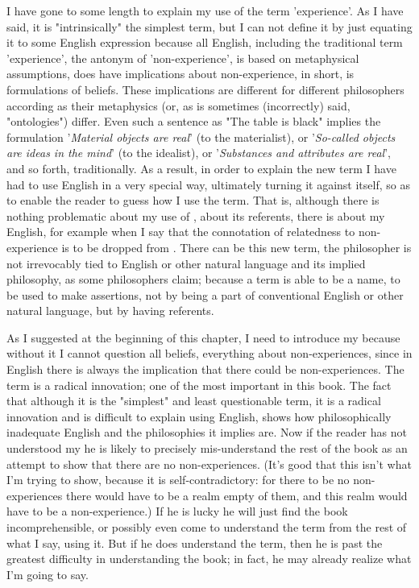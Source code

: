 \documentclass[10pt,twoside]{memoir}
\newcommand{\formulation}[1]{'\textit{#1}'}
\begin{document}
\begin{enumerate}
{I have gone to some length to explain my use of the term 'experience'. 
As I have said, it is "intrinsically" the simplest term, but I can not define it 
by just equating it to some English expression because all English, including 
the traditional term 'experience', the antonym of 'non-experience', is based 
on metaphysical assumptions, does have implications about non-experience, 
in short, is formulations of beliefs. These implications are different for 
different philosophers according as their metaphysics (or, as is sometimes 
(incorrectly) said, "ontologies") differ. Even such a sentence as "The table is 
black" implies the formulation \formulation{Material objects are real} (to the materialist), 
or \formulation{So-called objects are ideas in the mind} (to the idealist), or \formulation{Substances 
and attributes are real}, and so forth, traditionally. As a result, in order to 
explain the new term I have had to use English in a very special way, 
ultimately turning it against itself, so as to enable the reader to guess how I 
use the term. That is, although there is nothing problematic about my use of 
, about its referents, there is about my English, for example 
when I say that the connotation of relatedness to non-experience is to be 
dropped from . There can be this new term, the philosopher is 
not irrevocably tied to English or other natural language and its implied 
philosophy, as some philosophers claim; because a term is able to be a name, 
to be used to make assertions, not by being a part of conventional English or 
other natural language, but by having referents. 

As I suggested at the beginning of this chapter, I need to introduce my 
 because without it I cannot question all beliefs, everything 
about non-experiences, since in English there is always the implication that 
there could be non-experiences. The term is a radical innovation; one of the 
most important in this book. The fact that although it is the "simplest" and 
least questionable term, it is a radical innovation and is difficult to explain 
using English, shows how philosophically inadequate English and the 
philosophies it implies are. Now if the reader has not understood my 
 he is likely to precisely mis-understand the rest of the book as 
an attempt to show that there are no non-experiences. (It's good that this 
isn't what I'm trying to show, because it is self-contradictory: for there to be 
no non-experiences there would have to be a realm empty of them, and this 
realm would have to be a non-experience.) If he is lucky he will just find the 
book incomprehensible, or possibly even come to understand the term from 
the rest of what I say, using it. But if he does understand the term, then he is 
past the greatest difficulty in understanding the book; in fact, he may 
already realize what I'm going to say. 

}
\end{enumerate}
\end{document}
